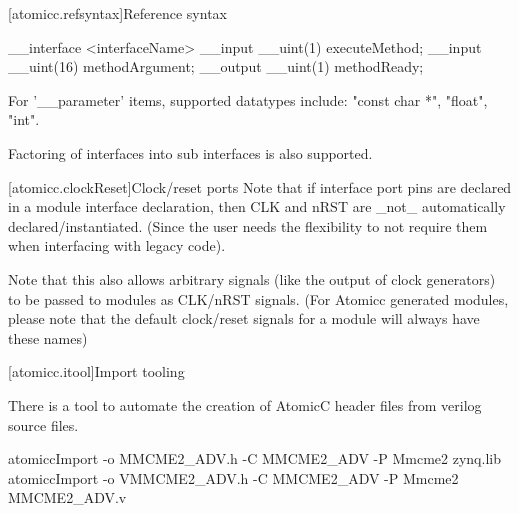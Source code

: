 [atomicc.refsyntax]{Reference syntax}

\begin{bnf}
\br
        \terminal{;}
\end{bnf}

\begin{bnf}
 \br
     \br
     \br
     \br
\end{bnf}

\begin{example}
\begin{codeblock}
     __interface <interfaceName> {
          __input __uint(1) executeMethod;
          __input __uint(16) methodArgument;
          __output __uint(1) methodReady;
     }
\end{codeblock}
\end{example}

For '__parameter' items, supported datatypes include: "const char *", "float", "int".

Factoring of interfaces into sub interfaces is also supported.

[atomicc.clockReset]{Clock/reset ports}
Note that if interface port pins are declared in a module interface declaration, then
CLK and nRST are _not_ automatically declared/instantiated.  (Since the user needs the
flexibility to not require them when interfacing with legacy code).

Note that this also allows arbitrary signals (like the output of clock generators) to be
passed to modules as CLK/nRST signals.  (For Atomicc generated modules, please note that the
default clock/reset signals for a module will always have these names)

[atomicc.itool]{Import tooling}

There is a tool to automate the creation of AtomicC header files from verilog source files.
\begin{example}
\begin{codeblock}
     atomiccImport -o MMCME2_ADV.h -C MMCME2_ADV -P Mmcme2 zynq.lib
     atomiccImport -o VMMCME2_ADV.h -C MMCME2_ADV -P Mmcme2 MMCME2_ADV.v
\end{codeblock}
\end{example}
